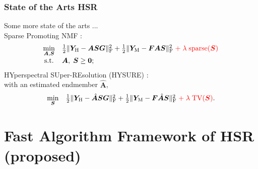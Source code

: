 \documentclass[10pt,mathserif]{beamer}
\newcommand{\YH}{\bm Y_\text H}
\newcommand{\YM}{\bm Y_\text M}
\newcommand{\Fr}{_\text F}
\begin{document}
    \begin{frame}
        \frametitle{State of the Arts HSR}
        Some more state of the arts ... \\
        \vspace{1cm}
        Sparse Promoting NMF \cite{SNNMF}:
        \[ \begin{array}{cl}
               \underset{\bm A,\bm S}{\min}
               &
               \frac{1}{2} \Vert \YH - \bm A \bm S \bm G \Vert\Fr^2
               +
               \frac{1}{2} \Vert \YM - \bm F \bm A \bm S \Vert\Fr^2
               \textcolor{red}{\; + \; \lambda \; \text{sparse} (\bm S)} \\
               \text{s.t.}
               &
               \bm A, \; \bm S \geq \bm 0;
           \end{array} \]
        HYperspectral SUper-REsolution (HYSURE) \cite{CONVEX_FORMULATION_HSR_VIA_SUBSPACE_REGULAR}:\\
        with an estimated endmember $\hat{\bm A}$,
        \[ \begin{array}{cl}
               \underset{\bm S}{\min}
               &
               \frac{1}{2} \Vert \YH - \hat{\bm A} \bm S \bm G \Vert\Fr^2
               +
               \frac{1}{2} \Vert \YM - \bm F \hat{\bm A} \bm S \Vert\Fr^2
               \textcolor{red}{\; + \; \lambda \; \text{TV} (\bm S)}.
           \end{array}\]
    \end{frame}
\section{Fast Algorithm Framework of HSR (proposed)}
\end{document}
